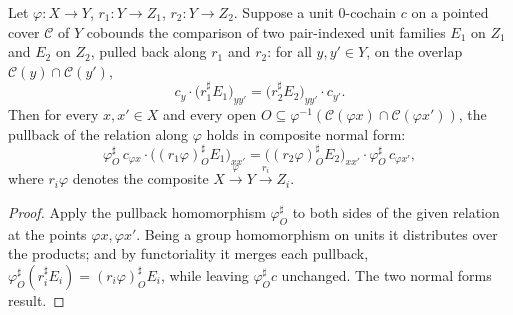 \begin{lemma}
  \label{pa-lem:unitsAppLE_coboundary_rel}
  \leanok

  Let \(\varphi \colon X \to Y\), \(r_1 \colon Y \to Z_1\), \(r_2 \colon Y \to Z_2\). Suppose a
  unit \(0\)-cochain \(c\) on a pointed cover \(\mathcal C\) of \(Y\) cobounds the comparison of
  two pair-indexed unit families \(E_1\) on \(Z_1\) and \(E_2\) on \(Z_2\), pulled back along
  \(r_1\) and \(r_2\): for all \(y, y' \in Y\), on the overlap
  \(\mathcal C(y) \cap \mathcal C(y')\),
  \[
    c_y \cdot \bigl(r_1^{\sharp} E_1\bigr)_{y y'}
      = \bigl(r_2^{\sharp} E_2\bigr)_{y y'} \cdot c_{y'} .
  \]
  Then for every \(x, x' \in X\) and every open \(O \subseteq \varphi^{-1}(\mathcal C(\varphi x)
  \cap \mathcal C(\varphi x'))\), the pullback of the relation along \(\varphi\) holds in
  composite normal form:
  \[
    \varphi^{\sharp}_O\, c_{\varphi x} \cdot \bigl((r_1\varphi)^{\sharp}_O E_1\bigr)_{x x'}
      = \bigl((r_2\varphi)^{\sharp}_O E_2\bigr)_{x x'} \cdot \varphi^{\sharp}_O\, c_{\varphi x'},
  \]
  where \(r_i\varphi\) denotes the composite \(X \xrightarrow{\varphi} Y \xrightarrow{r_i} Z_i\).
\end{lemma}
\begin{proof}
  \leanok
  Apply the pullback homomorphism \(\varphi^{\sharp}_O\) to both sides of the given relation at
  the points \(\varphi x, \varphi x'\). Being a group homomorphism on units it distributes over
  the products; and by functoriality it merges each pullback,
  \(\varphi^{\sharp}_O(r_i^{\sharp} E_i) = (r_i\varphi)^{\sharp}_O E_i\), while leaving
  \(\varphi^{\sharp}_O c\) unchanged. The two normal forms result.
\end{proof}

